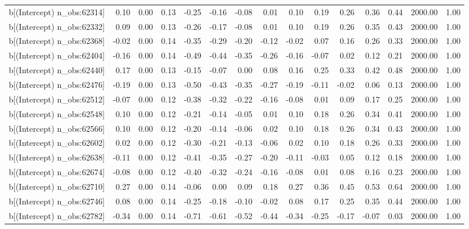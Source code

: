 \begin{table}[ht]
\begin{tabular}{rrrrrrrrrrrrrrr}
  b[(Intercept) n\_obs:62314] & 0.10 & 0.00 & 0.13 & -0.25 & -0.16 & -0.08 & 0.01 & 0.10 & 0.19 & 0.26 & 0.36 & 0.44 & 2000.00 & 1.00 \\ 
  b[(Intercept) n\_obs:62332] & 0.09 & 0.00 & 0.13 & -0.26 & -0.17 & -0.08 & 0.01 & 0.10 & 0.19 & 0.26 & 0.35 & 0.43 & 2000.00 & 1.00 \\ 
  b[(Intercept) n\_obs:62368] & -0.02 & 0.00 & 0.14 & -0.35 & -0.29 & -0.20 & -0.12 & -0.02 & 0.07 & 0.16 & 0.26 & 0.33 & 2000.00 & 1.00 \\ 
  b[(Intercept) n\_obs:62404] & -0.16 & 0.00 & 0.14 & -0.49 & -0.44 & -0.35 & -0.26 & -0.16 & -0.07 & 0.02 & 0.12 & 0.21 & 2000.00 & 1.00 \\ 
  b[(Intercept) n\_obs:62440] & 0.17 & 0.00 & 0.13 & -0.15 & -0.07 & 0.00 & 0.08 & 0.16 & 0.25 & 0.33 & 0.42 & 0.48 & 2000.00 & 1.00 \\ 
  b[(Intercept) n\_obs:62476] & -0.19 & 0.00 & 0.13 & -0.50 & -0.43 & -0.35 & -0.27 & -0.19 & -0.11 & -0.02 & 0.06 & 0.13 & 2000.00 & 1.00 \\ 
  b[(Intercept) n\_obs:62512] & -0.07 & 0.00 & 0.12 & -0.38 & -0.32 & -0.22 & -0.16 & -0.08 & 0.01 & 0.09 & 0.17 & 0.25 & 2000.00 & 1.00 \\ 
  b[(Intercept) n\_obs:62548] & 0.10 & 0.00 & 0.12 & -0.21 & -0.14 & -0.05 & 0.01 & 0.10 & 0.18 & 0.26 & 0.34 & 0.41 & 2000.00 & 1.00 \\ 
  b[(Intercept) n\_obs:62566] & 0.10 & 0.00 & 0.12 & -0.20 & -0.14 & -0.06 & 0.02 & 0.10 & 0.18 & 0.26 & 0.34 & 0.43 & 2000.00 & 1.00 \\ 
  b[(Intercept) n\_obs:62602] & 0.02 & 0.00 & 0.12 & -0.30 & -0.21 & -0.13 & -0.06 & 0.02 & 0.10 & 0.18 & 0.26 & 0.33 & 2000.00 & 1.00 \\ 
  b[(Intercept) n\_obs:62638] & -0.11 & 0.00 & 0.12 & -0.41 & -0.35 & -0.27 & -0.20 & -0.11 & -0.03 & 0.05 & 0.12 & 0.18 & 2000.00 & 1.00 \\ 
  b[(Intercept) n\_obs:62674] & -0.08 & 0.00 & 0.12 & -0.40 & -0.32 & -0.24 & -0.16 & -0.08 & 0.01 & 0.08 & 0.16 & 0.23 & 2000.00 & 1.00 \\ 
  b[(Intercept) n\_obs:62710] & 0.27 & 0.00 & 0.14 & -0.06 & 0.00 & 0.09 & 0.18 & 0.27 & 0.36 & 0.45 & 0.53 & 0.64 & 2000.00 & 1.00 \\ 
  b[(Intercept) n\_obs:62746] & 0.08 & 0.00 & 0.14 & -0.25 & -0.18 & -0.10 & -0.02 & 0.08 & 0.17 & 0.25 & 0.35 & 0.44 & 2000.00 & 1.00 \\ 
  b[(Intercept) n\_obs:62782] & -0.34 & 0.00 & 0.14 & -0.71 & -0.61 & -0.52 & -0.44 & -0.34 & -0.25 & -0.17 & -0.07 & 0.03 & 2000.00 & 1.00 \\ 

\end{tabular}
\end{table}
